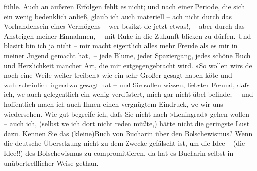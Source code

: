 \begin{ledgroupsized}[t]{13cm}
               fühle. Auch an äußeren Erfolgen fehlt es nicht; und nach einer Periode, die sich ein
               wenig bedenklich anließ, glaub ich auch materiell – ach nicht durch das Vorhandensein
               eines Vermögens – wer besitzt de{\geminationn} jetzt etwas!, – aber
               durch das Ansteigen meiner Einnahmen, – mit Ruhe in die Zukunft blicken zu dürfen.
               Und blasirt bin ich ja nicht – mir macht eigentlich alles mehr Freude als es mir in
               meiner Jugend gemacht hat, – jede Blume, jeder Spaziergang, jedes schöne Buch und
               Herzlichkeit mancher Art, die mir entgegengebracht wird. »So wollen wirs de{\geminationn} noch eine Weile weiter treiben« wie ein sehr Großer
               gesagt haben kö{\geminationn}te und wahrscheinlich irgendwo gesagt
               hat – und Sie sollen wissen, liebster Freund, daſs ich, we{\geminationn} auch gelegentlich ein wenig verdüstert, {\pb}mich gar nicht übel befinde; – und hoffentlich
               mach ich auch Ihnen einen vergnügtem Eindruck, we{\geminationn} wir
               uns wiedersehen.\pend
           \pstart
           Wie gut begreife ich, daſs Sie nicht nach »Leningrad« gehen wollen – auch ich, (selbst we{\geminationn}
               ich dort nicht reden müßte,) hätte nicht die geringste Lust dazu. Kennen Sie das \introOben{}(kleine)\introOben{}{ }Buch von Bucharin über den Bolschewismus? Wenn die deutsche Übersetzung
               nicht \label{T_L02444_2v}\label{T_L02444_2h} zu dem Zwecke gefälscht ist, um die Idee – (die
               Idee!!) des Bolschewismus zu compromittieren, da{\geminationn} hat es
                  Bucharin selbst in unübertrefflicher Weise
               gethan. –\pend

\end{ledgroupsized}
